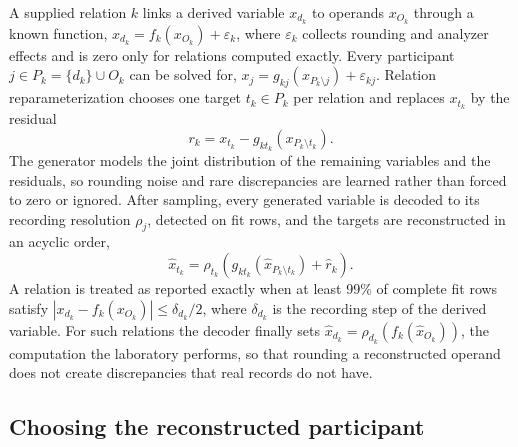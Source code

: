 \documentclass[pdflatex,referee]{sn-jnl}%
\begin{document}
A supplied relation $k$ links a derived variable $x_{d_k}$ to operands $x_{O_k}$ through a known function, $x_{d_k} = f_k(x_{O_k}) + \varepsilon_k$, where $\varepsilon_k$ collects rounding and analyzer effects and is zero only for relations computed exactly. Every participant $j \in P_k = \{d_k\} \cup O_k$ can be solved for, $x_j = g_{kj}(x_{P_k \setminus j}) + \varepsilon_{kj}$. Relation reparameterization chooses one target $t_k \in P_k$ per relation and replaces $x_{t_k}$ by the residual
\begin{equation}
r_k = x_{t_k} - g_{k t_k}\!\left(x_{P_k \setminus t_k}\right).
\label{eq:residual}
\end{equation}
The generator models the joint distribution of the remaining variables and the residuals, so rounding noise and rare discrepancies are learned rather than forced to zero or ignored. After sampling, every generated variable is decoded to its recording resolution $\rho_j$, detected on fit rows, and the targets are reconstructed in an acyclic order,
\begin{equation}
\hat{x}_{t_k} = \rho_{t_k}\!\left( g_{k t_k}(\hat{x}_{P_k \setminus t_k}) + \hat{r}_k \right).
\label{eq:decode}
\end{equation}
A relation is treated as reported exactly when at least 99\% of complete fit rows satisfy $|x_{d_k} - f_k(x_{O_k})| \le \delta_{d_k}/2$, where $\delta_{d_k}$ is the recording step of the derived variable. For such relations the decoder finally sets $\hat{x}_{d_k} = \rho_{d_k}(f_k(\hat{x}_{O_k}))$, the computation the laboratory performs, so that rounding a reconstructed operand does not create discrepancies that real records do not have.

\subsection*{Choosing the reconstructed participant}
\end{document}
